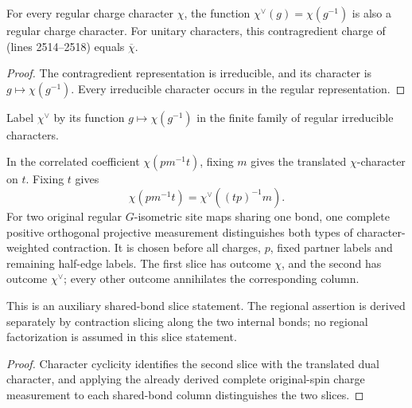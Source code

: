 \begin{lemma}
    \label{thm:peps_regular_contragredient_charge}
    \leanok
    For every regular charge character
    $\chi$, the function $\chi^\vee(g)=\chi(g^{-1})$ is also a
    regular charge character. For unitary characters, this contragredient charge of
    \cite[charge-pair creation]{Schuch2010PEPS} (lines 2514--2518) equals
    $\overline\chi$.
\end{lemma}
\begin{proof}\leanok
    The contragredient representation is irreducible, and its character
    is $g\mapsto\chi(g^{-1})$. Every irreducible character occurs in
    the regular representation.
\end{proof}

\begin{definition}
    \label{def:peps_regular_dual_charge_label}
    \leanok
    Label $\chi^\vee$ by its function $g\mapsto\chi(g^{-1})$ in the
    finite family of regular irreducible characters.
\end{definition}

\begin{lemma}
    \label{thm:peps_regular_physical_charge_pair_slices}
    \leanok
    In the correlated coefficient $\chi(pm^{-1}t)$, fixing $m$ gives the
    translated $\chi$-character on $t$. Fixing $t$ gives
    \[
        \chi(pm^{-1}t)=\chi^\vee((tp)^{-1}m).
    \]
    For two original regular $G$-isometric site maps sharing one bond,
    one complete positive orthogonal projective measurement distinguishes
    both types of character-weighted contraction. It is chosen before
    all charges, $p$, fixed partner labels and remaining half-edge labels.
    The first slice has outcome $\chi$, and the second has outcome
    $\chi^\vee$; every other outcome annihilates the corresponding column.

    This is an auxiliary shared-bond slice statement. The regional assertion is derived separately by contraction
    slicing along the two internal bonds; no regional factorization is
    assumed in this slice statement.
\end{lemma}
\begin{proof}\leanok
    Character cyclicity identifies the second slice with the translated
    dual character, and applying the already derived complete original-spin
    charge measurement to each shared-bond column distinguishes the two slices.
\end{proof}
